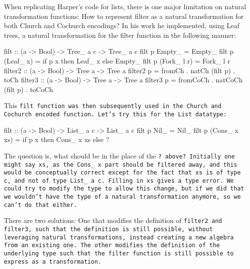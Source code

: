 When replicating Harper's code for lists, there is one major limitation on natural transformation functions:
How to represent filter as a natural transformation for both Church and Cochurch encodings?
In his work he implemented, using Leaf trees, a natural transformation for the filter function in the following manner:
\begin{spec}
filt :: (a -> Bool) -> Tree_ a c -> Tree_ a c
filt p Empty_ = Empty_
filt p (Leaf_ x) = if p x then Leaf_ x else Empty_
filt p (Fork_ l r) = Fork_ l r
filter2 :: (a -> Bool) -> Tree a -> Tree a
filter2 p = fromCh . natCh (filt p) . toCh
filter3 :: (a -> Bool) -> Tree a -> Tree a
filter3 p = fromCoCh . natCoCh (filt p) . toCoCh
\end{spec}
This \tt{filt} function was then subsequently used in the Church and Cochurch encoded function.
Let's try this for the \tt{List} datatype:
\begin{spec}
filt :: (a -> Bool) -> List_ a c -> List_ a c
filt p Nil_ = Nil_
filt p (Cons_ x xs) = if p x then Cons_ x xs else ? 
\end{spec}
The question is, what should be in the place of the \tt{?} above?
Initially one might say \tt{xs}, as the \tt{Cons\_ x} part should be filtered away, and this would be conceptually correct except for the fact that \tt{xs} is of type \tt{c}, and not of type \tt{List\_ a c}.
Filling in \tt{xs} gives a type error.
We could try to modify the type to allow this change, but if we did that we wouldn't have the type of a natural transformation anymore, so we can't do that either.

There are two solutions:
One that modifies the definition of \tt{filter2} and \tt{filter3}, such that the definition is still possible, without leveraging natural transformations, instead creating a new algebra from an existing one.
The other modifies the definition of the underlying type such that the filter function is still possible to express as a transformation.
    
